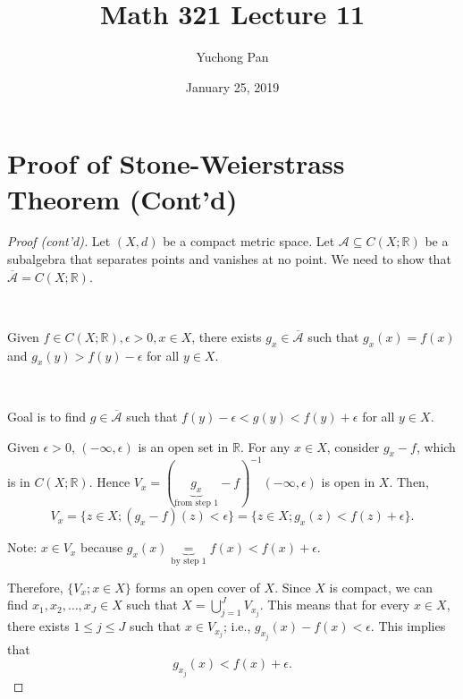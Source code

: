 \documentclass[letterpaper, reqno,11pt]{article}
\newcommand{\RR}{\mathbb{R}}
\begin{document}
\title{Math 321 Lecture 11}
\author{Yuchong Pan}
\date{January 25, 2019}
\newtheorem{thm}{Theorem}
\newtheorem{defn}{Definition}
\newtheorem*{remark}{Remark}
\newtheorem{claim}{Claim}
\newtheorem{cor}{Corollary}
\newtheorem{lemma}{Lemma}
\newtheorem{prop}{Proposition}
\maketitle
%

\section{Proof of Stone-Weierstrass Theorem (Cont'd)}

\begin{proof}[Proof (cont'd)]
  Let $(X, d)$ be a compact metric space. Let $\mathcal A \subseteq C(X; \RR)$ be a subalgebra that separates points and vanishes at no point. We need to show that $\overline{\mathcal A} = C(X; \RR)$.

  ~

   Given $f \in C(X; \RR), \epsilon > 0, x \in X$, there exists $g_x \in \overline{\mathcal A}$ such that $g_x(x) = f(x)$ and $g_x(y) > f(y) - \epsilon$ for all $y \in X$.

  ~

   Goal is to find $g \in \overline{\mathcal A}$ such that $f(y) - \epsilon < g(y) < f(y) + \epsilon$ for all $y \in X$.

   Given $\epsilon > 0$, $(-\infty, \epsilon)$ is an open set in $\RR$. For any $x \in X$, consider $g_x - f$, which is in $C(X; \RR)$. Hence $V_x = (\underbrace{g_x}_\text{from step 1} - f)^{-1}(-\infty, \epsilon)$ is open in $X$. Then,
  $$ V_x = \{ z \in X ; (g_x - f)(z) < \epsilon \} = \{ z \in X ; g_x(z) < f(z) + \epsilon \}. $$
  
  Note: $x \in V_x$ because $g_x(x) \underbrace{=}_\text{by step 1} f(x) < f(x) + \epsilon$.

  Therefore, $\{ V_x ; x \in X \}$ forms an open cover of $X$. Since $X$ is compact, we can find $x_1, x_2, \ldots, x_J \in X$ such that $X = \bigcup_{j = 1}^J V_{x_j}$. This means that for every $x \in X$, there exists $1 \leq j \leq J$ such that $x \in V_{x_j}$; i.e., $g_{x_j}(x) - f(x) < \epsilon$. This implies that
  \begin{equation} \label{eq:*} \tag{*}
    g_{x_j}(x) < f(x) + \epsilon.
  \end{equation}


\end{proof}
\end{document}
